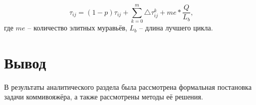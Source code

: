 \begin{equation}
	\label{eq:elitephermon}
	\tau_{ij} = (1-p)\tau_{ij} + \sum_{k=0}^{m}\triangle\tau_{ij}^k +me*\frac{Q}{L_b},
\end{equation}
где $me$ --  количество элитных муравьёв, $L_b$ -- длина лучшего цикла.

\section*{Вывод}

В результаты аналитического раздела была рассмотрена формальная постановка задачи коммивояжёра, а также рассмотрены методы её решения.


\clearpage

